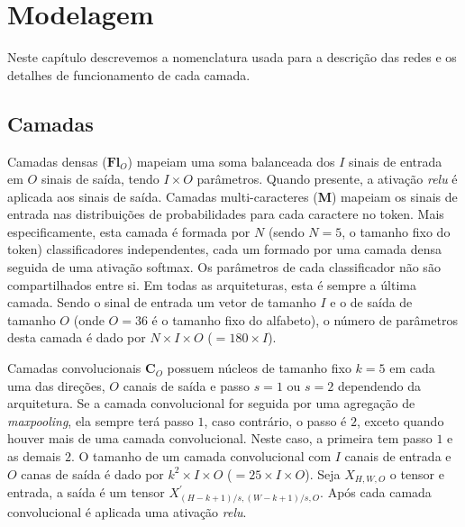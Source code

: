 \chapter{Modelagem}\label{cap:modelagem}

Neste capítulo descrevemos a nomenclatura usada para a descrição das redes e os detalhes de funcionamento de cada camada.

\section{Camadas}

Camadas densas ($\mathbf{Fl}_{O}$) mapeiam uma soma balanceada dos $I$ sinais de entrada em $O$ sinais de saída, tendo $I \times O$ parâmetros. Quando presente, a ativação \textit{relu} é aplicada aos sinais de saída. Camadas multi-caracteres (\textbf{M}) mapeiam os sinais de entrada nas distribuições de probabilidades para cada caractere no token. Mais especificamente, esta camada é formada por $N$ (sendo $N=5$, o tamanho fixo do token) classificadores independentes, cada um formado por uma camada densa seguida de uma ativação softmax. Os parâmetros de cada classificador não são compartilhados entre si. Em todas as arquiteturas, esta é sempre a última camada. Sendo o sinal de entrada um vetor de tamanho $I$ e o de saída de tamanho $O$ (onde $O=36$ é o tamanho fixo do alfabeto), o número de parâmetros desta camada é dado por $N \times I \times O$ ($ = 180 \times I$). 

Camadas convolucionais $\mathbf{C}_{O}$ possuem núcleos de tamanho fixo $k=5$ em cada uma das direções, $O$ canais de saída e passo $s=1$ ou $s=2$ dependendo da arquitetura. Se a camada convolucional for seguida por uma agregação de \textit{maxpooling}, ela sempre terá passo $1$, caso contrário, o passo é $2$, exceto quando houver mais de uma camada convolucional. Neste caso, a primeira tem passo $1$ e as demais $2$. O tamanho de um camada convolucional com $I$ canais de entrada e $O$ canas de saída é dado por $k^2 \times I \times O$ ($= 25 \times I \times O$). Seja $X_{H, W, O}$ o tensor e entrada, a saída é um tensor $X^{'}_{\left(H - k + 1\right)/s, \left(W - k + 1\right)/s, O}$. Após cada camada convolucional é aplicada uma ativação \textit{relu}.

